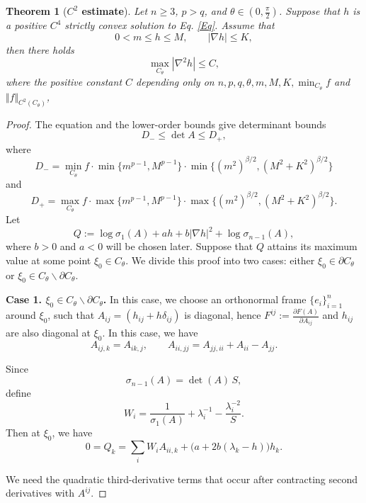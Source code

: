 \documentclass[11pt]{amsart}
\numberwithin{equation} {section}
\numberwithin{equation}{section}
\newtheorem{theorem}{\bf Theorem}[section]
\begin{document}
\begin{theorem}[{\bf{$C^2$ estimate}}]\label{c2 estimate}
Let $n\geq 3$, $p>q$, and $\theta\in (0,\frac{\pi}{2})$. Suppose that $h$ is a
positive $C^4$ strictly convex solution to Eq. \eqref{Eq}. Assume that
\[
        0<m\leq h\leq M,\qquad |\nabla h|\leq K,
\]
then there holds 
\begin{equation}\label{d1}
        \max_{C_{\theta}}|\nabla^2h|\leq C,
\end{equation}
where the positive constant $C$ depending only on
$n,p,q,\theta,m,M,K,\min_{C_{\theta}}f$ and
$\Vert f\Vert_{C^2(C_{\theta})}$, 
\end{theorem}

\begin{proof}
The equation and the lower-order bounds give determinant bounds
\[
        D_-\leq\det A\leq D_+,
\]
where
\[
        D_- =
        \min_{C_{\theta}}f\cdot\min\{m^{p-1},M^{p-1}\}
        \cdot\min\{(m^2)^{\beta/2},(M^2+K^2)^{\beta/2}\}
\]
and
\[
        D_+ =
        \max_{C_{\theta}}f\cdot\max\{m^{p-1},M^{p-1}\}
        \cdot\max\{(m^2)^{\beta/2},(M^2+K^2)^{\beta/2}\}.
\]
Let
\begin{equation}\label{auxiliary Q}
        Q:=\log\sigma_1(A)+ah+b|\nabla h|^2+\log\sigma_{n-1}(A),
\end{equation}
where $b>0$ and $a<0$ will be chosen later. Suppose that $Q$ attains its maximum value at some point $\xi_0\in C_{\theta}$. We divide this proof into two cases: either $\xi_0\in \partial C_{\theta}$ or $\xi_0\in C_{\theta} \backslash \partial C_{\theta}$.

\noindent\textbf{Case 1. $\xi_0\in C_{\theta} \backslash \partial C_{\theta}$.}
In this case, we choose an orthonormal frame $\{e_i\}_{i=1}^n$ around $\xi_0$, such that $A_{ij}=(h_{ij}+h\delta_{ij})$ is diagonal, hence $F^{ij}:=\frac{\partial F(A)}{\partial A_{ij}}$ and $h_{ij}$ are also diagonal at $\xi_0$. In this case, we have
\[
        A_{ij,k}=A_{ik,j},\qquad
        A_{ii,jj}=A_{jj,ii}+A_{ii}-A_{jj}.
\]

Since
\[
        \sigma_{n-1}(A)=\det(A)\,S,
\]
define
\[
        W_i=\frac{1}{\sigma_1(A)}+\lambda_i^{-1}
        -\frac{\lambda_i^{-2}}{S}.
\]
Then at $\xi_0$, we have
\begin{equation}\label{Q stationary}
        0=Q_k
        =\sum_iW_iA_{ii,k}+\bigl(a+2b(\lambda_k-h)\bigr)h_k.
\end{equation}

We need the quadratic third-derivative terms that occur after contracting
second derivatives with $A^{ij}$.


\end{proof}
\end{document}
